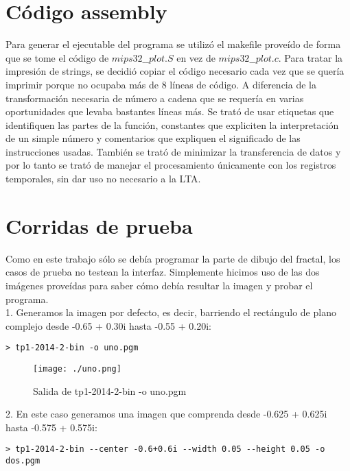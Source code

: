 \documentclass[a4paper,10pt]{article}
\begin{document}
\section{C\'odigo assembly}
Para generar el ejecutable del programa se utiliz\'o el makefile prove\'ido de forma que se tome 
el c\'odigo de $mips32\_\_plot.S$ en vez de $mips32\_\_plot.c$. 
Para tratar la impresi\'on de strings, se decidi\'o copiar el c\'odigo necesario cada vez que se quer\'ia 
imprimir porque no ocupaba m\'as de 8 l\'ineas de c\'odigo. A diferencia de la transformaci\'on 
necesaria de n\'umero a cadena que se requer\'ia en varias oportunidades que levaba bastantes l\'ineas m\'as. 
Se trat\'o de usar etiquetas que identifiquen las partes de la funci\'on, constantes que expliciten la interpretaci\'on de un simple n\'umero y comentarios que expliquen 
el significado de las instrucciones usadas.
Tambi\'en se trat\'o de minimizar la transferencia de datos y por lo tanto se trat\'o de manejar el 
procesamiento \'unicamente con los registros temporales, sin dar uso no necesario a la LTA. 


\pagebreak




\section{Corridas de prueba}

Como en este trabajo s\'olo se deb\'ia programar la parte de dibujo del fractal, los casos de prueba 
no testean la interfaz. Simplemente hicimos uso de las dos im\'agenes prove\'idas para saber c\'omo 
deb\'ia resultar la imagen y probar el programa.\\

1. Generamos la imagen por defecto, es decir, barriendo el rect\'angulo de plano complejo desde 
-0.65 + 0.30i hasta -0.55 + 0.20i:
\begin{verbatim}
> tp1-2014-2-bin -o uno.pgm
\end{verbatim}

\begin{figure}
\begin{center}
\texttt{[image: ./uno.png]}
\label{fig:Region barrida por defecto.}
\caption{Salida de tp1-2014-2-bin -o uno.pgm}
\end{center}
\end{figure}


2. En este caso generamos una imagen que comprenda desde -0.625 + 0.625i hasta -0.575 + 0.575i:
\begin{verbatim}
> tp1-2014-2-bin --center -0.6+0.6i --width 0.05 --height 0.05 -o dos.pgm
\end{verbatim}
\end{document}
